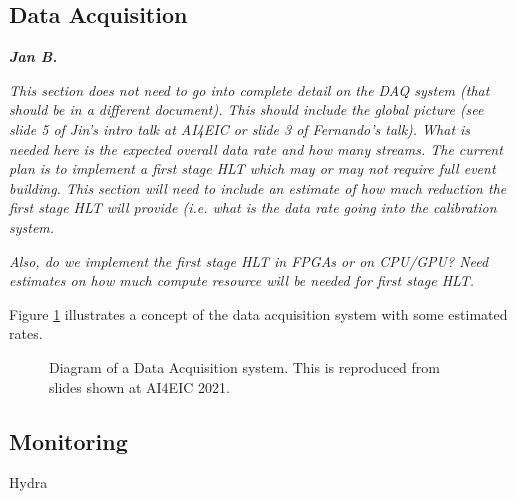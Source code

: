 \subsection{Data Acquisition}

\textbf{\emph{Jan B.}}

\emph{This section does not need to go into complete detail on the DAQ system (that should be in a different document). This should include the global picture (see slide 5 of Jin's intro talk at AI4EIC or slide 3 of Fernando's talk). What is needed here is the expected overall data rate and how many streams. The current plan is to implement a first stage HLT which may or may not require full event building. This section will need to include an estimate of how much reduction the first stage HLT will provide (i.e. what is the data rate going into the calibration system.}

\emph{Also, do we implement the first stage HLT in FPGAs or on CPU/GPU? Need estimates on how much compute resource will be needed for first stage HLT.}

Figure \ref{fig:data_acquisition_diagram} illustrates a concept of the data acquisition system with some estimated rates.

\begin{figure}[hbt!]
 \begin{center}
  \caption[Data Acquisition Diagram]{\label{fig:data_acquisition_diagram} Diagram of a Data Acquisition system. This is reproduced from slides shown at AI4EIC 2021\cite{EIC_readout_overview_AI4EIC_2021}. }
 \end{center}
\end{figure}

\subsection{Monitoring}

Hydra\cite{Hydra2021}
